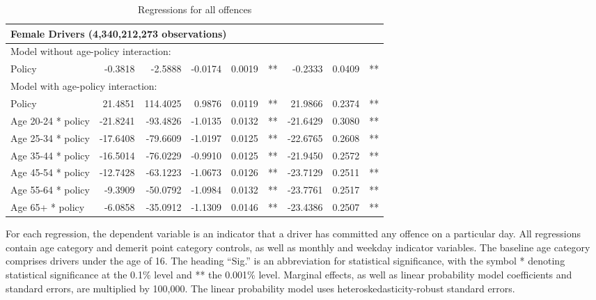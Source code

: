 \begin{table}
\begin{tabular}{l r r r r l r r l}
\hline 

\multicolumn{8}{l}{\textbf{Female Drivers} (4,340,212,273 observations)} \\ 

\hline
\multicolumn{8}{l}{Model without age-policy interaction: } \\ 
Policy                   &  -0.3818        &  -2.5888       &  -0.0174        &  0.0019       &   **       &  -0.2333        &  0.0409       &   **       \\ 
\hline
\multicolumn{8}{l}{Model with age-policy interaction: } \\ 
Policy                   &  21.4851        &  114.4025       &  0.9876        &  0.0119       &   **       &  21.9866        &  0.2374       &   **       \\ 
Age 20-24 * policy   &  -21.8241        &  -93.4826       &  -1.0135        &  0.0132       &   **       &  -21.6429        &  0.3080       &   **       \\ 
Age 25-34 * policy   &  -17.6408        &  -79.6609       &  -1.0197        &  0.0125       &   **       &  -22.6765        &  0.2608       &   **       \\ 
Age 35-44 * policy   &  -16.5014        &  -76.0229       &  -0.9910        &  0.0125       &   **       &  -21.9450        &  0.2572       &   **       \\ 
Age 45-54 * policy   &  -12.7428        &  -63.1223       &  -1.0673        &  0.0126       &   **       &  -23.7129        &  0.2511       &   **       \\ 
Age 55-64 * policy   &  -9.3909        &  -50.0792       &  -1.0984        &  0.0132       &   **       &  -23.7761        &  0.2517       &   **       \\ 
Age 65+ * policy   &  -6.0858        &  -35.0912       &  -1.1309        &  0.0146       &   **       &  -23.4386        &  0.2507       &   **       \\ 

\hline 

\end{tabular} 
\caption{Regressions for all offences} 
For each regression, the dependent variable is an indicator that a driver has committed  
any offence on a particular day.  
All regressions contain age category and demerit point category controls, 
as well as monthly and weekday indicator variables. 
The baseline age category comprises drivers under the age of 16. 
The heading ``Sig.'' is an abbreviation for statistical significance, with 
the symbol * denoting statistical significance at the 0.1\% level 
and ** the 0.001\% level. 
Marginal effects, as well as linear probability model coefficients and standard errors, are  
multiplied by 100,000.  
The linear probability model uses heteroskedasticity-robust standard errors. 
\label{tab:seas_Logit_vs_LPMx100K_regs} 
\end{table} 
 
